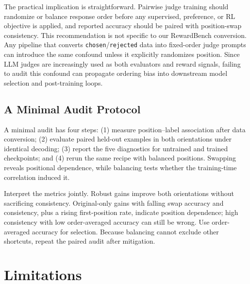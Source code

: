\documentclass[11pt]{article}
\begin{document}
The practical implication is straightforward. Pairwise judge training should randomize or balance response order before any supervised, preference, or RL objective is applied, and reported accuracy should be paired with position-swap consistency. This recommendation is not specific to our RewardBench conversion. Any pipeline that converts \texttt{chosen}/\texttt{rejected} data into fixed-order judge prompts can introduce the same confound unless it explicitly randomizes position. Since LLM judges are increasingly used as both evaluators and reward signals, failing to audit this confound can propagate ordering bias into downstream model selection and post-training loops.

\subsection{A Minimal Audit Protocol}

A minimal audit has four steps: (1) measure position--label association after data conversion; (2) evaluate paired held-out examples in both orientations under identical decoding; (3) report the five diagnostics for untrained and trained checkpoints; and (4) rerun the same recipe with balanced positions. Swapping reveals positional dependence, while balancing tests whether the training-time correlation induced it.

Interpret the metrics jointly. Robust gains improve both orientations without sacrificing consistency. Original-only gains with falling swap accuracy and consistency, plus a rising first-position rate, indicate position dependence; high consistency with low order-averaged accuracy can still be wrong. Use order-averaged accuracy for selection. Because balancing cannot exclude other shortcuts, repeat the paired audit after mitigation.

\section*{Limitations}
\end{document}
